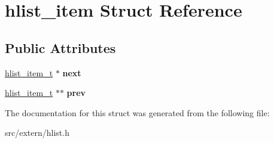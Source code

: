 \hypertarget{structhlist__item}{\section{hlist\-\_\-item Struct Reference}
\label{structhlist__item}
}
\subsection*{Public Attributes}
\begin{DoxyCompactItemize}
\item 
\hypertarget{structhlist__item_a0b5816d4103b21452ca6bbb1d037b5c9}{\hyperlink{structhlist__item}{hlist\-\_\-item\-\_\-t} $\ast$ {\bfseries next}}\label{structhlist__item_a0b5816d4103b21452ca6bbb1d037b5c9}

\item 
\hypertarget{structhlist__item_a9f5be49ad861d3573c7c68067500c7ad}{\hyperlink{structhlist__item}{hlist\-\_\-item\-\_\-t} $\ast$$\ast$ {\bfseries prev}}\label{structhlist__item_a9f5be49ad861d3573c7c68067500c7ad}

\end{DoxyCompactItemize}


The documentation for this struct was generated from the following file\-:\begin{DoxyCompactItemize}
\item 
src/extern/hlist.\-h\end{DoxyCompactItemize}
